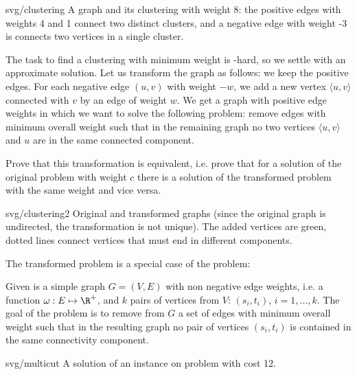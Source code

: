 \begin{myfig}{0.3\textwidth}{svg/clustering}
  A graph and its clustering with weight 8: the positive edges with weights 4 and 1 connect two distinct clusters,
  and a negative edge with weight -3 is connects two vertices in a single cluster.
\end{myfig}

\noindent
The task to find a clustering with minimum weight is \NP-hard, so we settle with an approximate solution. 
Let us transform the graph as follows: we keep the positive edges. For each negative edge $(u,v)$ with weight $-w$,
we add a new vertex $\langle u,v\rangle$ connected with $v$ by an edge of weight $w$. We get a graph 
with positive edge weights in which we want to solve the following problem: remove edges with minimum 
overall weight such that in the remaining graph no two vertices $\langle u,v\rangle$ and $u$ are
in the same connected component.

\begin{prob}
  Prove that this transformation is equivalent, i.e. prove that for a solution of the original problem with 
  weight $c$ there is a solution of the transformed problem with the same weight and vice versa.
\end{prob}

\begin{myfig}{0.7\textwidth}{svg/clustering2}
  Original and transformed graphs (since the original graph is undirected, the transformation
  is not unique). The added vertices are green, dotted lines connect vertices that must end in 
  different components. 
\end{myfig}

\noindent
The transformed problem is a special case of the \minmulticut problem:


\begin{framed}
  \begin{dfn}
    \label{dfn:multicut}
    Given is a simple graph $G=(V,E)$ with non negative edge weights, i.e. a function 
    $\omega:E\mapsto \R^+$, and $k$ pairs of vertices from $V$: $(s_i,t_i)$, $i=1,\ldots,k$.
    The goal of the problem \minmulticut is to remove from $G$ a set of edges with minimum overall
    weight such that in the resulting graph no pair of vertices $(s_i,t_i)$ is contained in the same
    connectivity component.
  \end{dfn}
\end{framed}

\begin{myfig}{0.55\textwidth}{svg/multicut}
  A solution of an instance on \minmulticut problem with cost 12.
\end{myfig}


